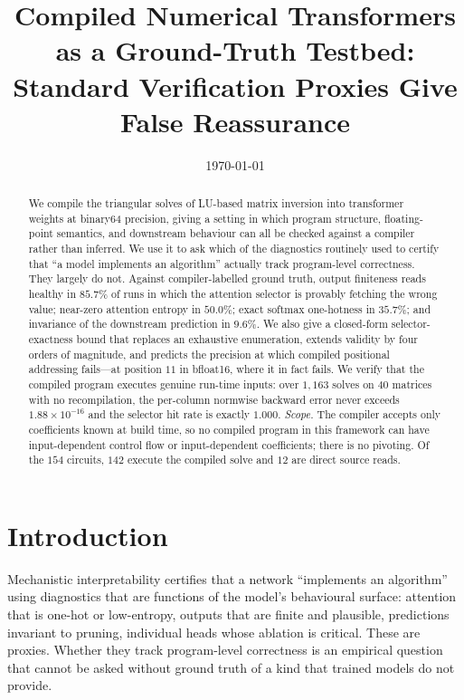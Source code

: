 \documentclass[11pt]{article}
\title{Compiled Numerical Transformers as a Ground-Truth Testbed:\\
Standard Verification Proxies Give False Reassurance}
\author{\todo{authors}}
\date{\today}
\begin{document}
\maketitle

\begin{abstract}
We compile the triangular solves of LU-based matrix inversion into transformer
weights at binary64 precision, giving a setting in which program structure,
floating-point semantics, and downstream behaviour can all be checked against a
compiler rather than inferred. We use it to ask which of the diagnostics
routinely used to certify that ``a model implements an algorithm'' actually
track program-level correctness. They largely do not. Against compiler-labelled
ground truth, output finiteness reads healthy in $85.7\%$ of runs in which the
attention selector is provably fetching the wrong value; near-zero attention
entropy in $50.0\%$; exact softmax one-hotness in $35.7\%$; and invariance of the
downstream prediction in $9.6\%$. We also give a closed-form
selector-exactness bound that replaces an exhaustive enumeration, extends
validity by four orders of magnitude, and predicts the precision at which
compiled positional addressing fails---at position $11$ in bfloat16, where it
in fact fails. We verify that the compiled program executes genuine run-time
inputs: over $1{,}163$ solves on $40$ matrices with no recompilation, the
per-column normwise backward error never exceeds $1.88\times10^{-16}$ and the
selector hit rate is exactly $1.000$.
\emph{Scope.} The compiler accepts only coefficients known at build time, so no
compiled program in this framework can have input-dependent control flow or
input-dependent coefficients; there is no pivoting. Of the $154$ circuits, $142$
execute the compiled solve and $12$ are direct source reads.
\end{abstract}

\section{Introduction}

Mechanistic interpretability certifies that a network ``implements an
algorithm'' using diagnostics that are functions of the model's behavioural
surface: attention that is one-hot or low-entropy, outputs that are finite and
plausible, predictions invariant to pruning, individual heads whose ablation is
critical. These are proxies. Whether they track program-level correctness is an
empirical question that cannot be asked without ground truth of a kind that
trained models do not provide.
\end{document}
